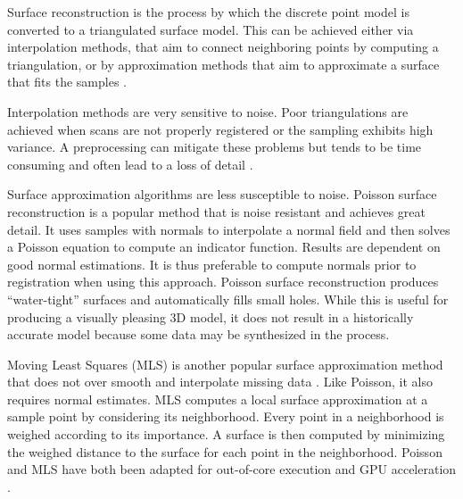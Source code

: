 
Surface reconstruction is the process by which the discrete point model is converted to a triangulated surface model. This can be achieved either via interpolation methods, that aim to connect neighboring points by computing a triangulation, or by approximation methods that aim to approximate a surface that fits the samples \cite{Schall2005}.

Interpolation methods are very sensitive to noise. Poor triangulations are achieved when scans are not properly registered or the sampling exhibits high variance. A preprocessing can mitigate these problems but tends to be time consuming and often lead to a loss of detail \cite{Ruther2011}.

Surface approximation algorithms are less susceptible to noise. Poisson surface reconstruction \cite{Kazhdan2006} is a popular method that is noise resistant and achieves great detail. It uses samples with normals to interpolate a normal field and then solves a Poisson equation to compute an indicator function. Results are dependent on good normal estimations. It is thus preferable to compute normals prior to registration when using this approach. Poisson surface reconstruction produces ``water-tight'' surfaces and automatically fills small holes. While this is useful for producing a visually pleasing 3D model, it does not result in a historically accurate model because some data may be synthesized in the process.

Moving Least Squares (MLS) is another popular surface approximation method that does not over smooth and interpolate missing data \cite{Merry2014}. Like Poisson, it also requires normal estimates. MLS computes a local surface approximation at a sample point by considering its neighborhood. Every point in a neighborhood is weighed according to its importance. A surface is then computed by minimizing the weighed distance to the surface for each point in the neighborhood. Poisson and MLS have both been adapted for out-of-core execution and GPU acceleration \cite{Merry2014}. 




